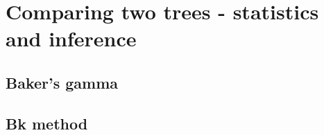 \documentclass[shortnames,nojss,article]{jss}\usepackage{graphicx, color}
\begin{document}
\section{Comparing two trees - statistics and inference}

\subsection{Baker's gamma}

\subsection{Bk method}














% 
% 
% 
% 
% 
%   
%   
% 
% 


\end{document}
